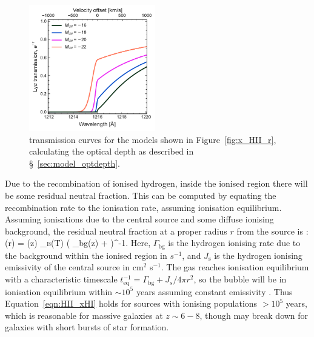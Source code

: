 \documentclass[fleqn,usenatbib]{mnras}
\begin{document}
\begin{figure}
    \includegraphics[width=0.49\textwidth]{figs/fig3.pdf}
    \caption{\lya transmission curves for the models shown in Figure~\ref{fig:x_HII_r}, calculating the optical depth as described in \S~\ref{sec:model_optdepth}.}
    \label{fig:transmission_Muv}
\end{figure}
Due to the recombination of ionised hydrogen, inside the ionised region there will be some residual neutral fraction. This can be computed by equating the recombination rate to the ionisation rate, assuming ionisation equilibrium. Assuming ionisations due to the central source and some diffuse ionising background, the residual neutral fraction at a proper radius $r$ from the source is \citep[e.g.,][]{Mesinger2004}:
%
\BE \label{eqn:HII_xHI}
\xHI(r) = \clump \nh(z) \alpha_\textsc{b}(T) \left( \Gamma_\textrm{bg}(z) +  \right)^{-1}.
\EE
%
Here, $\Gamma_\textrm{bg}$ is the hydrogen ionising rate due to the background within the ionised region in $s^{-1}$, and $J_\mathrm{s}$ is the hydrogen ionising emissivity of the central source in cm$^2$ s$^{-1}$. The gas reaches ionisation equilibrium with a characteristic timescale $t_\mathrm{eq}^{-1} = \Gamma_\mathrm{bg} + J_s/4\pi r^2$, so the bubble will be in ionisation equilibrium within $\sim10^5$ years assuming constant emissivity \citep[e.g.,][]{Davies2019}. Thus Equation~\eqref{eqn:HII_xHI} holds for sources with ionising populations $>10^5$ years, which is reasonable for massive galaxies at $z\sim6-8$, though may break down for galaxies with short bursts of star formation.
\end{document}
